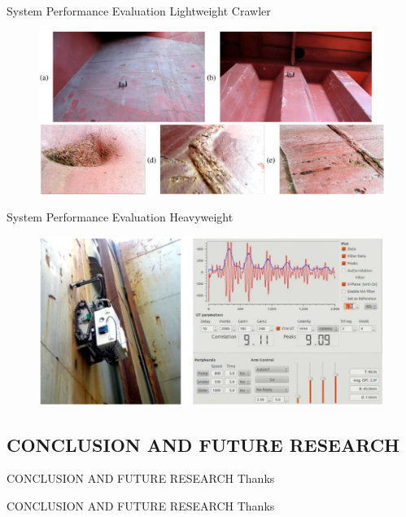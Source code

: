 \documentclass{beamer}
\begin{document}
            \begin{frame}{System Performance Evaluation}
                Lightweight Crawler  
                \begin{figure}[htb]
                    \centering
                    \includegraphics[scale=0.18]{figuras/frist_trial_for_the_lightweight_crawler.png}                   
                    \label{}
                \end{figure}         
            \end{frame}
            
            \begin{frame}{System Performance Evaluation}
                Heavyweight 
                \begin{figure}[htb]
                    \centering
                    \includegraphics[scale=0.3]{figuras/MARC_on_a_vertical.png}                   
                    \label{}
                \end{figure}           
            \end{frame}
            
        \subsection{CONCLUSION AND FUTURE RESEARCH}
            \begin{frame}{CONCLUSION AND FUTURE RESEARCH}
                \centering Thanks           
            \end{frame}
            
            \begin{frame}{CONCLUSION AND FUTURE RESEARCH}
                \centering Thanks           
            \end{frame}
\end{document}
